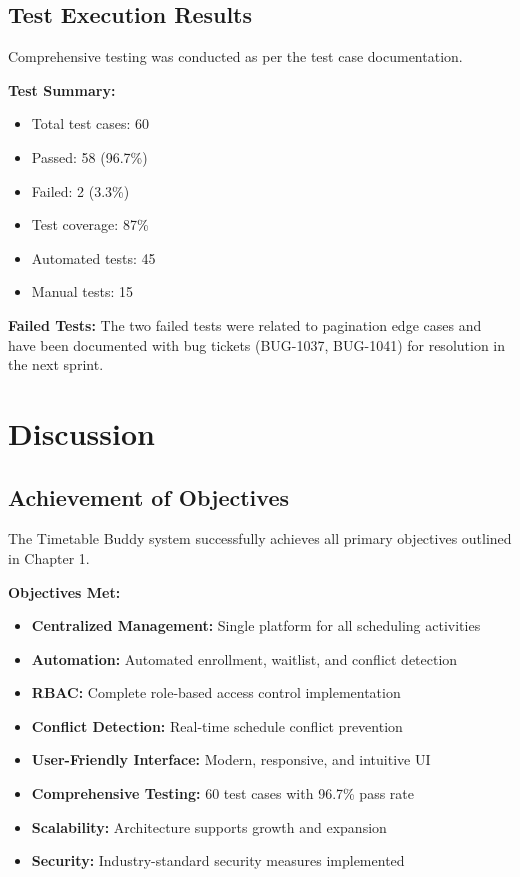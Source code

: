 \subsection{Test Execution Results}
Comprehensive testing was conducted as per the test case documentation.

\textbf{Test Summary:}
\begin{itemize}
    \item Total test cases: 60
    \item Passed: 58 (96.7\%)
    \item Failed: 2 (3.3\%)
    \item Test coverage: 87\%
    \item Automated tests: 45
    \item Manual tests: 15
\end{itemize}

\textbf{Failed Tests:} The two failed tests were related to pagination edge cases and have been documented with bug tickets (BUG-1037, BUG-1041) for resolution in the next sprint.

\section{Discussion}

\subsection{Achievement of Objectives}
The Timetable Buddy system successfully achieves all primary objectives outlined in Chapter 1.

\textbf{Objectives Met:}
\begin{itemize}
    \item \textbf{Centralized Management:} Single platform for all scheduling activities
    \item \textbf{Automation:} Automated enrollment, waitlist, and conflict detection
    \item \textbf{RBAC:} Complete role-based access control implementation
    \item \textbf{Conflict Detection:} Real-time schedule conflict prevention
    \item \textbf{User-Friendly Interface:} Modern, responsive, and intuitive UI
    \item \textbf{Comprehensive Testing:} 60 test cases with 96.7\% pass rate
    \item \textbf{Scalability:} Architecture supports growth and expansion
    \item \textbf{Security:} Industry-standard security measures implemented
\end{itemize}

